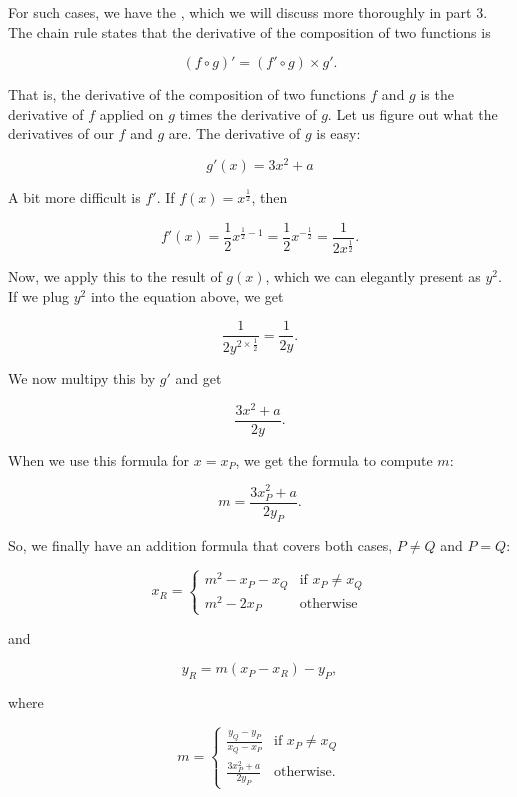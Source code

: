 \documentclass[tikz]{scrreprt}
\begin{document}
For such cases, we have the ,
which we will discuss more thoroughly in part 3.
The chain rule states that the derivative of
the composition of two functions is

\begin{equation}
(f \circ g)' = (f' \circ g) \times g'.
\end{equation}

That is, the derivative of the composition 
of two functions $f$ and $g$ is 
the derivative of $f$ applied on $g$ times the
derivative of $g$. Let us figure out 
what the derivatives of our $f$ and $g$ are. 
The derivative of $g$ is easy:

\[
g'(x) = 3x^2 + a
\]

A bit more difficult is $f'$. If $f(x) = x^\frac{1}{2}$,
then 

\[
f'(x) = 
\frac{1}{2}x^{\frac{1}{2}-1} = 
\frac{1}{2}x^{-\frac{1}{2}}  =
\frac{1}{2x^{\frac{1}{2}}}. 
\]

Now, we apply this to the result of $g(x)$,
which we can elegantly present as $y^2$. 
If we plug $y^2$ into the equation above,
we get 

\[
\frac{1}{2y^{2\times\frac{1}{2}}} = \frac{1}{2y}.
\]

We now multipy this by $g'$ and get 

\[
\frac{3x^2 + a}{2y}.
\]

When we use this formula for $x=x_P$,
we get the formula to compute $m$:

\begin{equation}
m = \frac{3x_P^2 + a}{2y_P}.
\end{equation}

So, we finally have an addition formula
that covers both cases, $P \neq Q$ and $P = Q$:

\begin{equation}
x_R = \begin{cases}
        m^2 - x_P - x_Q & \textrm{if $x_P \neq x_Q$}\\
        m^2 - 2x_P      & \textrm{otherwise}
      \end{cases}
\end{equation}

and

\begin{equation}
y_R = m(x_P-x_R) - y_P,
\end{equation}

where

\begin{equation}
m = \begin{cases}
      \frac{y_Q - y_P}{x_Q - x_P} & \textrm{if  $x_P \neq x_Q$}\\[10pt]
      \frac{3x_P^2 + a}{2y_P}     & \textrm{otherwise}.
    \end{cases}
\end{equation}
\end{document}
